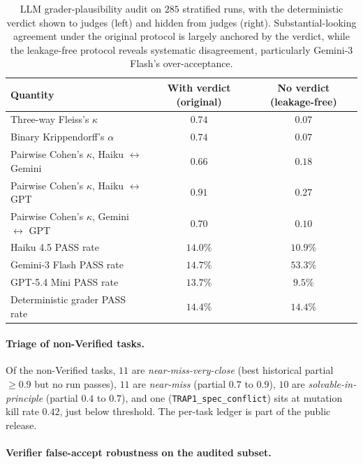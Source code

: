 \documentclass{article}
\begin{document}
\begin{table}[h]
\centering
\caption{LLM grader-plausibility audit on $285$ stratified runs, with the deterministic verdict shown to judges (left) and hidden from judges (right). Substantial-looking agreement under the original protocol is largely anchored by the verdict, while the leakage-free protocol reveals systematic disagreement, particularly Gemini-3 Flash's over-acceptance.}
\label{tab:rater-leakage}
\small
\setlength{\tabcolsep}{6pt}
\begin{tabular}{lcc}
\toprule
Quantity & With verdict (original) & No verdict (leakage-free) \\
\midrule
Three-way Fleiss's $\kappa$           & $0.74$  & $0.07$ \\
Binary Krippendorff's $\alpha$        & $0.74$  & $0.07$ \\
Pairwise Cohen's $\kappa$, Haiku $\leftrightarrow$ Gemini & $0.66$ & $0.18$ \\
Pairwise Cohen's $\kappa$, Haiku $\leftrightarrow$ GPT   & $0.91$ & $0.27$ \\
Pairwise Cohen's $\kappa$, Gemini $\leftrightarrow$ GPT  & $0.70$ & $0.10$ \\
Haiku 4.5 PASS rate                   & $14.0\%$ & $10.9\%$ \\
Gemini-3 Flash PASS rate              & $14.7\%$ & $53.3\%$ \\
GPT-5.4 Mini PASS rate                & $13.7\%$ & $9.5\%$ \\
Deterministic grader PASS rate        & $14.4\%$ & $14.4\%$ \\
\bottomrule
\end{tabular}
\end{table}

\paragraph{Triage of non-Verified tasks.} Of the non-Verified tasks, $11$ are \emph{near-miss-very-close} (best historical partial $\geq 0.9$ but no run passes), $11$ are \emph{near-miss} (partial $0.7$ to $0.9$), $10$ are \emph{solvable-in-principle} (partial $0.4$ to $0.7$), and one (\texttt{TRAP1\_spec\_conflict}) sits at mutation kill rate $0.42$, just below threshold. The per-task ledger is part of the public release.

\paragraph{Verifier false-accept robustness on the audited subset.}
\end{document}
